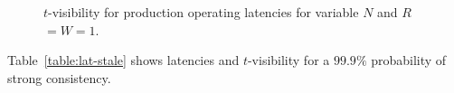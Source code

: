 \documentclass{vldb}
\begin{document}
\begin{figure}
\centering
{}
\caption{$t$-visibility for production operating latencies for variable $N$ and $R$$=$$W$$=$$1$.}
\label{fig:varyn}
\end{figure}


Table~\ref{table:lat-stale} shows latencies and $t$-visibility for a $99.9\%$ probability of strong consistency.
\end{document}
